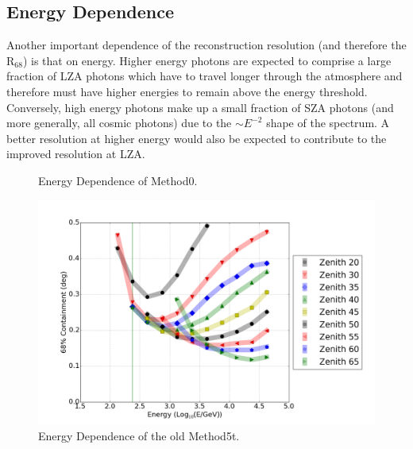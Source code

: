 \documentclass[main.tex]{subfiles}
\begin{document}
\subsection{Energy Dependence}
Another important dependence of the reconstruction resolution (and therefore the R$_{68}$) is that on energy. Higher energy photons are expected to comprise a large fraction of LZA photons which have to travel longer through the atmosphere and therefore must have higher energies to remain above the energy threshold. Conversely, high energy photons make up a small fraction of SZA photons (and more generally, all cosmic photons) due to the $\sim E^{-2}$ shape of the spectrum. A better resolution at higher energy would also be expected to contribute to the improved resolution at LZA.

\begin{figure}[htbp]
  \centering
  \caption{Energy Dependence of Method0.}
  \label{fig:energy_reg}
\end{figure}

\begin{figure}[htbp]
  \centering
  \includegraphics[width=.9\linewidth]{images/disp_standard_energy}
  \caption{Energy Dependence of the old Method5t.}
  \label{fig:energy_disp_standard}    
\end{figure}
\end{document}
